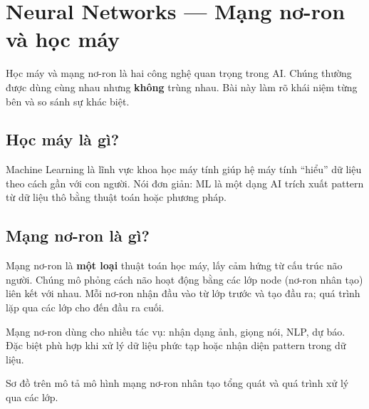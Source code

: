 \section{Neural Networks --- Mạng nơ-ron và học máy}

\begin{dongco}[title={Hai khái niệm thường đi cùng nhau}]
Học máy và mạng nơ-ron là hai công nghệ quan trọng trong AI.
Chúng thường được dùng cùng nhau nhưng \textbf{không} trùng nhau.
Bài này làm rõ khái niệm từng bên và so sánh sự khác biệt.
\end{dongco}

\subsection{Học máy là gì?}

\begin{dinhnghia}[title={Machine Learning}]
Machine Learning là lĩnh vực khoa học máy tính giúp hệ máy tính ``hiểu'' dữ liệu theo cách gần với con người.
Nói đơn giản: ML là một dạng AI trích xuất pattern từ dữ liệu thô bằng thuật toán hoặc phương pháp.
\end{dinhnghia}

\subsection{Mạng nơ-ron là gì?}

\begin{dinhnghia}[title={Neural Networks}]
Mạng nơ-ron là \textbf{một loại} thuật toán học máy, lấy cảm hứng từ cấu trúc não người.
Chúng mô phỏng cách não hoạt động bằng các lớp node (nơ-ron nhân tạo) liên kết với nhau.
Mỗi nơ-ron nhận đầu vào từ lớp trước và tạo đầu ra; quá trình lặp qua các lớp cho đến đầu ra cuối.
\end{dinhnghia}

\begin{ynghia}[title={Ứng dụng}]
Mạng nơ-ron dùng cho nhiều tác vụ: nhận dạng ảnh, giọng nói, NLP, dự báo.
Đặc biệt phù hợp khi xử lý dữ liệu phức tạp hoặc nhận diện pattern trong dữ liệu.
\end{ynghia}

\begin{vidu}[title={Mô hình ANN tổng quát}]
Sơ đồ trên mô tả mô hình mạng nơ-ron nhân tạo tổng quát và quá trình xử lý qua các lớp.
\end{vidu}


